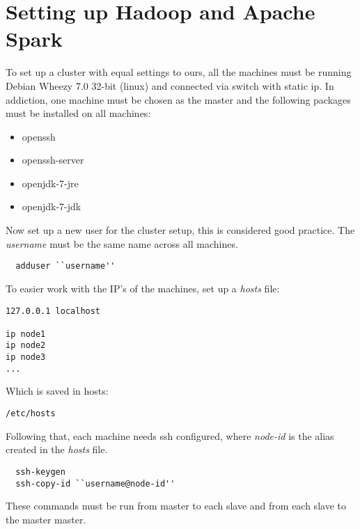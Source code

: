 \section{Setting up Hadoop and Apache Spark}
\label{sec:hadoop}
To set up a cluster with equal settings to ours, all the machines must be running Debian Wheezy 7.0 32-bit (linux) and connected via switch with static ip. In addiction, one machine must be chosen as the master and the following packages must be installed on all machines:
\begin{itemize}
\item openssh 
\item openssh-server 
\item openjdk-7-jre 
\item openjdk-7-jdk 
\end{itemize}
Now set up a new user for the cluster setup, this is considered good practice. The \emph{username} must be the same name across all machines.
\lstset{language=bash}
\begin{lstlisting}
  adduser ``username''
\end{lstlisting} %
To easier work with the IP's of the machines, set up a \emph{hosts} file:
\begin{verbatim}
127.0.0.1 localhost

ip node1
ip node2
ip node3
...
\end{verbatim}
Which is saved in hosts: 
\begin{verbatim}
/etc/hosts
\end{verbatim}
Following that, each machine needs ssh configured, where \emph{node-id} is the alias created in the \emph{hosts} file.
\begin{lstlisting}
  ssh-keygen
  ssh-copy-id ``username@node-id''
\end{lstlisting}
These commands must be run from master to each slave and from each slave to the master master.

